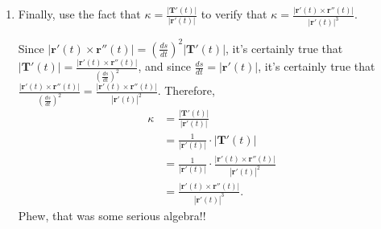 \documentclass[10pt]{article}
\newcommand{\vu}{\mathbf{u}}
\newcommand{\vv}{\mathbf{v}}
\newcommand{\vr}{\mathbf{r}}
\newcommand{\vT}{\mathbf{T}}
\newenvironment{red}{\color{red}}{\ignorespacesafterend}
\begin{document}
\begin{enumerate}[leftmargin=0pt]
{\begin{enumerate}
    \begin{red}
        I'm going to use the fact that $|\vu\times\vv| = |\vu||\vv|\sin(\theta)$. In this case, $|\vT(t) \times \vT'(t)| = |\vT(t)| \cdot |\vT'(t)| \cdot \sin(\theta)$, and $\sin(\theta) = 1$ since the two vectors are always orthogonal. Therefore, $|\vT(t) \times \vT'(t)| = |\vT(t)| \cdot |\vT'(t)| = 1 \cdot |\vT'(t)| = |\vT'(t)|$, since $|\vT(t)| =1$.
        Therefore, 
        \begin{align*}
            |\vr'(t) \times \vr''(t)| &=
            \left\lvert \left( \frac{ds}{dt} \right)^2 (\vT(t) \times \vT'(t)) \right \rvert \\
            &= \left( \frac{ds}{dt} \right)^2 \lvert \vT(t) \times \vT'(t) \rvert \\
            &= \left( \frac{ds}{dt} \right)^2 |\vT'(t)|.
        \end{align*}
    \end{red}
    
    \item Finally, use the fact that $\kappa = \frac{\lvert \vT'(t) \rvert }{\lvert \vr'(t) \rvert}$ to verify that $\kappa = \frac{\lvert \vr'(t) \times \vr''(t) \rvert}{\lvert \vr'(t) \rvert^3}.$
    
    \begin{red}
        Since $\lvert \vr'(t) \times \vr''(t) \rvert = \left(\frac{ds}{dt}\right)^2 \lvert \vT'(t) \rvert$, it's certainly true that $|\vT'(t)| = \frac{\lvert \vr'(t) \times \vr''(t) \rvert}{\left(\frac{ds}{dt}\right)^2}$, and since $\frac{ds}{dt} = |\vr'(t)|$, it's certainly true that $\frac{\lvert \vr'(t) \times \vr''(t) \rvert}{\left(\frac{ds}{dt}\right)^2} = \frac{\lvert \vr'(t) \times \vr''(t) \rvert}{|\vr'(t)|^2}$. Therefore,
        \begin{align*}
            \kappa &= \frac{\lvert \vT'(t) \rvert }{\lvert \vr'(t) \rvert} \\
            &= \frac{1}{\lvert \vr'(t) \rvert} \cdot |\vT'(t)| \\
            &=  \frac{1}{\lvert \vr'(t) \rvert} \cdot \frac{\lvert \vr'(t) \times \vr''(t) \rvert}{|\vr'(t)|^2} \\
            &= \frac{\lvert \vr'(t) \times \vr''(t) \rvert}{|\vr'(t)|^3}.
        \end{align*}
        Phew, that was some serious algebra!!
    \end{red}
\end{enumerate}
}

\end{enumerate}
\end{document}
